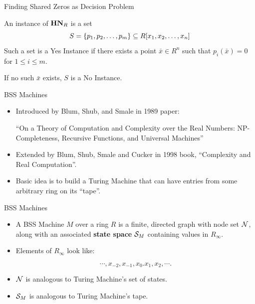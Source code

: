 \documentclass[c]{beamer}
\begin{document}
\begin{frame}{Finding Shared Zeros as Decision Problem}

  An instance of $\mathbf{HN}_R$ is a set 
  $$S = \{p_1, p_2, \ldots, p_m\} \subseteq R[x_1, x_2,\ldots,x_n]$$ 
  Such a set is a Yes Instance if there exists a point $\bar{x} \in
  R^n$ such that $p_i(\bar{x}) = 0$ for $1 \leq i \leq m$.

  \vspace{\baselineskip}
  
  If no such $\bar{x}$ exists, $S$ is a No Instance.
  
\end{frame}

\begin{frame}{BSS Machines}

  \begin{itemize}
  \item[] Introduced by Blum, Shub, and Smale in 1989 paper:
    
    ``On a Theory of Computation and Complexity over the Real Numbers:
    NP-Completeness, Recursive Functions, and Universal Machines''

    \vspace{\baselineskip}

  \item[] Extended by Blum, Shub, Smale and Cucker in 1998 book,
    ``Complexity and Real Computation''.

    \vspace{\baselineskip}

  \item[] Basic idea is to build a Turing Machine that can have
    entries from some arbitrary ring on its ``tape''.
  \end{itemize}
\end{frame}

\begin{frame}{BSS Machines}

  \begin{itemize}
  \item[] A BSS Machine $M$ over a ring $R$ is a finite, directed graph
    with node set $\mathcal{N}$, along with an associated \textbf{state
      space} $\mathcal{S}_M$ containing values in $R_\infty$.\pause

    \vspace{\baselineskip}

  \item[] Elements of $R_\infty$ look like:
    
    \vspace{-.8\baselineskip}
    
    $$\cdots, x_{-2}, x_{-1}, x_0 . x_1, x_2, \cdots.$$
    \pause
  \item[] $\mathcal{N}$ is analogous to Turing Machine's set of
    states.
  \item[] $\mathcal{S}_M$ is analogous to Turing Machine's tape.
  \end{itemize}

\end{frame}
\end{document}
